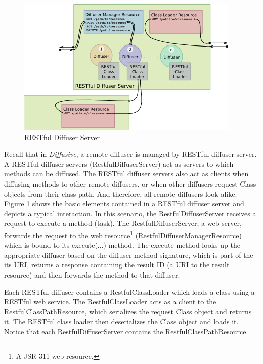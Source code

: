 \documentclass[11pt]{article}
\begin{document}
\begin{figure}[htbp]
\begin{center}
\includegraphics[scale=1.1]{restful_diffuser_server}
\caption{RESTful Diffuser Server}
\label{fig:restful_diffuser_server}
\end{center}
\end{figure}

Recall that in \emph{Diffusive}, a remote diffuser is managed by RESTful diffuser server. A RESTful diffuser servers (\textsf{RestfulDiffuserServer}) act as servers to which methods can be diffused. The RESTful diffuser servers also act as clients when diffusing methods to other remote diffusers, or when other diffusers request \textsf{Class} objects from their class path. And therefore, all remote diffusers look alike. Figure \ref{fig:restful_diffuser_server} shows the basic elements contained in a RESTful diffuser server and depicts a typical interaction. In this scenario, the \textsf{RestfulDiffuserServer} receives a request to execute a method (task). The \textsf{RestfulDiffuserServer}, a web server, forwards the request to the web resource\footnote{A JSR-311 web resource.} (\textsf{RestfulDiffuserManagerResource}) which is bound to its \textsf{execute(...)} method. The execute method looks up the appropriate diffuser based on the diffuser method signature, which is part of the its URI, returns a response containing the result ID (a URI to the result resource) and then forwards the method to that diffuser. 

Each RESTful diffuser contains a \textsf{RestfulClassLoader} which loads a class using a RESTful web service. The \textsf{RestfulClassLoader} acts as a client to the \textsf{RestfulClassPathResource}, which serializes the request \textsf{Class} object and returns it. The RESTful class loader then deserializes the \textsf{Class} object and loads it. Notice that each \textsf{RestfulDiffuserServer} contains the \textsf{RestfulClassPathResource}.
\end{document}
